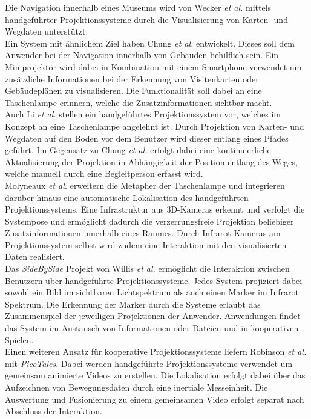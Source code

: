 Die Navigation innerhalb eines Museums wird von Wecker \textit{et al.} \cite{Wecker2013} mittels handgeführter Projektionssysteme durch die Visualisierung von Karten- und Wegdaten unterstützt.\\
Ein System mit ähnlichem Ziel haben Chung \textit{et al.} \cite{Chung2011} entwickelt. Dieses soll dem Anwender bei der Navigation innerhalb von Gebäuden behilflich sein. Ein Miniprojektor wird dabei in Kombination mit einem Smartphone verwendet um zusätzliche Informationen bei der Erkennung von Visitenkarten oder Gebäudeplänen zu visualisieren. Die Funktionalität soll dabei an eine Taschenlampe erinnern, welche die Zusatzinformationen sichtbar macht.\\
Auch Li \textit{et al.} \cite{Li2013} stellen ein handgeführtes Projektionssystem vor, welches im Konzept an eine Taschenlampe angelehnt ist. Durch Projektion von Karten- und Wegdaten auf den Boden vor dem Benutzer wird dieser entlang eines Pfades geführt. Im Gegensatz zu Chung \textit{et al.} erfolgt dabei eine kontinuierliche Aktualisierung der Projektion in Abhängigkeit der Position entlang des Weges, welche manuell durch eine Begleitperson erfasst wird.\\
Molyneaux \textit{et al.} \cite{Molyneaux2012} erweitern die Metapher der Taschenlampe und integrieren darüber hinaus eine automatische Lokalisation des handgeführten Projektionssystems. Eine Infrastruktur aus 3D-Kameras erkennt und verfolgt die Systempose und ermöglicht dadurch die verzerrungsfreie Projektion beliebiger Zusatzinformationen innerhalb eines Raumes. Durch Infrarot Kameras am Projektionssystem selbst wird zudem eine Interaktion mit den visualisierten Daten realisiert.\\

Das \textit{SideBySide} Projekt von Willis \textit{et al.} \cite{Willis2011} ermöglicht die Interaktion zwischen Benutzern über handgeführte Projektionssysteme. Jedes System projiziert dabei sowohl ein Bild im sichtbaren Lichtspektrum als auch einen Marker im Infrarot Spektrum. Die Erkennung der Marker durch die Systeme erlaubt das Zusammenspiel der jeweiligen Projektionen der Anwender. Anwendungen findet das System im Austausch von Informationen oder Dateien und in kooperativen Spielen.\\
Einen weiteren Ansatz für kooperative Projektionssysteme liefern Robinson \textit{et al.} \cite{Robinson2012} mit \textit{PicoTales}. Dabei werden handgeführte Projektionssysteme verwendet um gemeinsam animierte Videos zu erstellen. Die Lokalisation erfolgt dabei über das Aufzeichnen von Bewegungsdaten durch eine inertiale Messeinheit. Die Auswertung und Fusionierung zu einem gemeinsamen Video erfolgt separat nach Abschluss der Interaktion.\\


